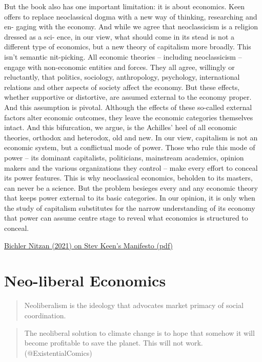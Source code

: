 \documentclass[
]{book}
\begin{document}
But the book also has one important limitation: it is about economics.
Keen offers to replace neoclassical dogma with a new way of thinking, researching and en-
gaging with the economy. And while we agree that neoclassicism is a religion dressed as a sci-
ence, in our view, what should come in its stead is not a different type of economics, but a new
theory of capitalism more broadly.
This isn't semantic nit-picking. All economic theories -- including neoclassicism -- engage
with non-economic entities and forces. They all agree, willingly or reluctantly, that politics,
sociology, anthropology, psychology, international relations and other aspects of society affect
the economy. But these effects, whether supportive or distortive, are assumed external to the
economy proper. And this assumption is pivotal. Although the effects of these so-called external
factors alter economic outcomes, they leave the economic categories themselves intact. And this
bifurcation, we argue, is the Achilles' heel of all economic theories, orthodox and heterodox,
old and new.
In our view, capitalism is not an economic system, but a conflictual mode of power. Those
who rule this mode of power -- its dominant capitalists, politicians, mainstream academics,
opinion makers and the various organizations they control -- make every effort to conceal its
power features. This is why neoclassical economics, beholden to its masters, can never be a
science. But the problem besieges every and any economic theory that keeps power external to
its basic categories. In our opinion, it is only when the study of capitalism substitutes for the
narrow understanding of its economy that power can assume centre stage to reveal what economics is structured to conceal.

\href{pdf/BN_2021_on_Steve_Keen_The_new_economics_Manifesto.pdf}{Bichler Nitzan (2021) on Stev Keen's Manifesto (pdf)}

\hypertarget{neo-liberal-economics}{%
\chapter{Neo-liberal Economics}\label{neo-liberal-economics}}

\begin{quote}
Neoliberalism is the ideology that advocates market primacy of social coordination.
\end{quote}

\begin{quote}
The neoliberal solution to climate change is to hope that somehow it will become profitable to save the planet. This will not work.
(@ExistentialComics)
\end{quote}
\end{document}
